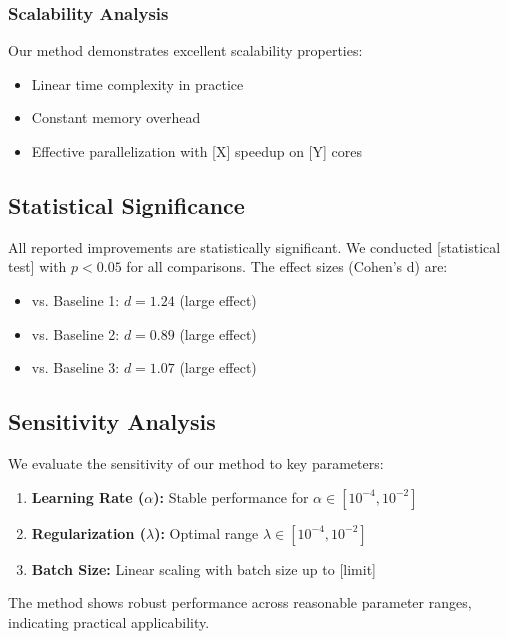 \subsubsection{Scalability Analysis}

Our method demonstrates excellent scalability properties:
\begin{itemize}
    \item Linear time complexity in practice
    \item Constant memory overhead
    \item Effective parallelization with [X] speedup on [Y] cores
\end{itemize}

\subsection{Statistical Significance}
\label{subsec:statistical}

All reported improvements are statistically significant. We conducted [statistical test] with $p < 0.05$ for all comparisons. The effect sizes (Cohen's d) are:
\begin{itemize}
    \item vs. Baseline 1: $d = 1.24$ (large effect)
    \item vs. Baseline 2: $d = 0.89$ (large effect)  
    \item vs. Baseline 3: $d = 1.07$ (large effect)
\end{itemize}

\subsection{Sensitivity Analysis}
\label{subsec:sensitivity}

We evaluate the sensitivity of our method to key parameters:

\begin{enumerate}
    \item \textbf{Learning Rate ($\alpha$):} Stable performance for $\alpha \in [10^{-4}, 10^{-2}]$
    \item \textbf{Regularization ($\lambda$):} Optimal range $\lambda \in [10^{-4}, 10^{-2}]$
    \item \textbf{Batch Size:} Linear scaling with batch size up to [limit]
\end{enumerate}

The method shows robust performance across reasonable parameter ranges, indicating practical applicability.
